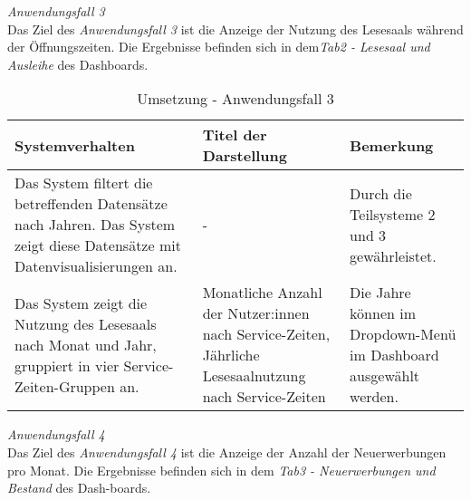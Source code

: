     \endgroup

\clearpage
\noindent
\textit{Anwendungsfall 3}\\
Das Ziel des \textit{Anwendungsfall 3} ist die Anzeige der Nutzung des Lesesaals während der Öffnungszeiten.
Die Ergebnisse befinden sich in dem\textit{Tab2 - Lesesaal und Ausleihe} des Dashboards.

\begingroup
    \setlength{\tabcolsep}{12pt} %
    \renewcommand{\arraystretch}{1.5}
    \begin{table}[h]
        \Large
        \centering
        \begin{adjustbox}{max width=\textwidth}
        \begin{tabular}{p{}p{}p{}}
           \toprule
           Systemverhalten        &Titel der Darstellung&Bemerkung\\
           \midrule
           Das System filtert die betreffenden Datensätze nach Jahren. Das System zeigt diese Datensätze mit Datenvisualisierungen an.&-&Durch die Teilsysteme 2  und 3 gewährleistet.\\
           Das System zeigt die Nutzung des Lesesaals nach Monat und Jahr, gruppiert in vier Service-Zeiten-Gruppen an.&Monatliche Anzahl der Nutzer:innen nach Service-Zeiten, Jährliche Lesesaalnutzung nach Service-Zeiten& Die Jahre können im Dropdown-Menü im Dashboard ausgewählt werden.\\

        \bottomrule
        \end{tabular}
        \end{adjustbox}
        \caption{%
            Umsetzung - Anwendungsfall 3
        }
        \label{tab:Anwendungsfall 3 - Umgesetzte Anforderungen}
        \end{table}
\endgroup

\clearpage
\noindent
\textit{Anwendungsfall 4}\\
Das Ziel des \textit{Anwendungsfall 4} ist die Anzeige der Anzahl der Neuerwerbungen pro Monat.
Die Ergebnisse befinden sich in dem \textit{Tab3 - Neuerwerbungen und Bestand} des Dash-boards.

